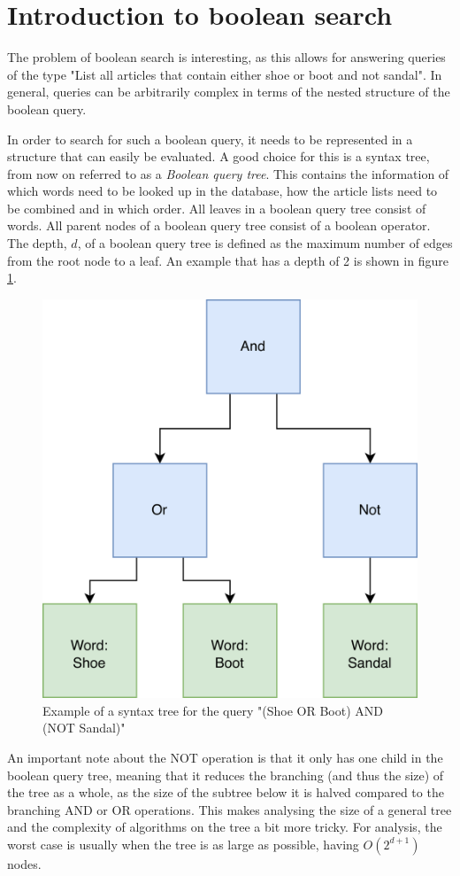\section{Introduction to boolean search}

The problem of boolean search is interesting, as this allows for answering queries of the type "List all articles that contain either shoe or boot and not sandal". In general, queries can be arbitrarily complex in terms of the nested structure of the boolean query. 

In order to search for such a boolean query, it needs to be represented in a structure that can easily be evaluated. A good choice for this is a syntax tree, from now on referred to as a \textit{Boolean query tree}. This contains the information of which words need to be looked up in the database, how the article lists need to be combined and in which order. All leaves in a boolean query tree consist of words. All parent nodes of a boolean query tree consist of a boolean operator. The depth, $d$, of a boolean query tree is defined as the maximum number of edges from the root node to a leaf. An example that has a depth of 2 is shown in figure \ref{fig:bool-st-example}.

\begin{figure}[ht!]
    \centering
    \includegraphics[width=.5\textwidth]{LaTeX/Figures/BooleanST.png}
    \caption{Example of a syntax tree for the query "(Shoe OR Boot) AND (NOT Sandal)"}
    \label{fig:bool-st-example}
\end{figure}

An important note about the NOT operation is that it only has one child in the boolean query tree, meaning that it reduces the branching (and thus the size) of the tree as a whole, as the size of the subtree below it is halved compared to the branching AND or OR operations. This makes analysing the size of a general tree and the complexity of algorithms on the tree a bit more tricky. For analysis, the worst case is usually when the tree is as large as possible, having $O(2^{d+1})$ nodes. 

